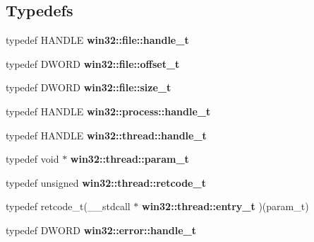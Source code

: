 \subsection*{Typedefs}
\begin{CompactItemize}
\item 
typedef HANDLE {\bf win32::file::handle\_\-t}\label{namespacewin32_1_1file_e91a5cd70974fc1184d0b922540829fb}

\item 
typedef DWORD {\bf win32::file::offset\_\-t}\label{namespacewin32_1_1file_da7afdb243c93a8f58e5f6cae87f8cba}

\item 
typedef DWORD {\bf win32::file::size\_\-t}\label{namespacewin32_1_1file_4bf26395801dcda2362105efd320c5db}

\item 
typedef HANDLE {\bf win32::process::handle\_\-t}\label{namespacewin32_1_1process_e91a5cd70974fc1184d0b922540829fb}

\item 
typedef HANDLE {\bf win32::thread::handle\_\-t}\label{namespacewin32_1_1thread_e91a5cd70974fc1184d0b922540829fb}

\item 
typedef void $\ast$ {\bf win32::thread::param\_\-t}\label{namespacewin32_1_1thread_46e87de097271aa79cfc8c0ab2954bfc}

\item 
typedef unsigned {\bf win32::thread::retcode\_\-t}\label{namespacewin32_1_1thread_45cf3e4ac1a525717c8ed1a631f35118}

\item 
typedef retcode\_\-t(\_\-\_\-stdcall $\ast$ {\bf win32::thread::entry\_\-t} )(param\_\-t)\label{namespacewin32_1_1thread_48bb8987a096a2899ee6f8f369bac582}

\item 
typedef DWORD {\bf win32::error::handle\_\-t}\label{namespacewin32_1_1error_e91a5cd70974fc1184d0b922540829fb}

\end{CompactItemize}
